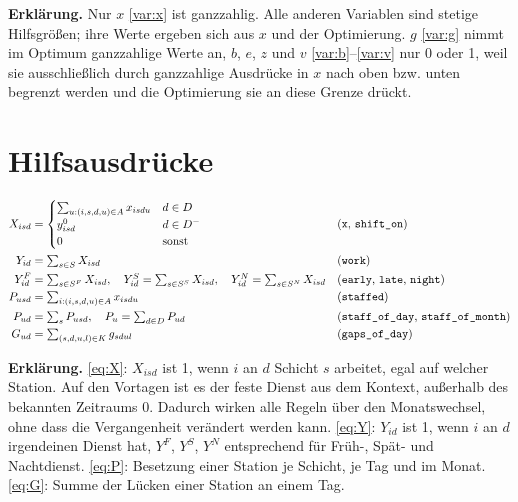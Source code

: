 \documentclass[11pt]{combiArticle}
\newcommand{\Dm}{D^{-}}
\newcommand{\code}[1]{\texttt{#1}}
\begin{document}
\textbf{Erklärung.}
Nur $x$ \eqref{var:x} ist ganzzahlig. Alle anderen Variablen sind stetige Hilfsgrößen; ihre Werte ergeben
sich aus $x$ und der Optimierung. $g$ \eqref{var:g} nimmt im Optimum ganzzahlige Werte an, $b$, $e$, $z$
und $v$ \eqref{var:b}--\eqref{var:v} nur 0 oder 1, weil sie ausschließlich durch ganzzahlige Ausdrücke in $x$
nach oben bzw. unten begrenzt werden und die Optimierung sie an diese Grenze drückt.

\section{Hilfsausdrücke}

\begin{align}
  X_{isd} &= \begin{cases}
      \sum_{u : (i,s,d,u) \in A} x_{isdu} & d \in D\\
      y^{0}_{isd} & d \in \Dm\\
      0 & \text{sonst}
    \end{cases} && \text{(\code{x}, \code{shift\_on})} \label{eq:X}\\
  Y_{id} &= \textstyle\sum_{s \in S} X_{isd} && \text{(\code{work})} \label{eq:Y}\\
  Y^{F}_{id} &= \textstyle\sum_{s \in S^{F}} X_{isd},\quad
  Y^{S}_{id} = \sum_{s \in S^{S}} X_{isd},\quad
  Y^{N}_{id} = \sum_{s \in S^{N}} X_{isd} && \text{(\code{early}, \code{late}, \code{night})} \notag\\
  P_{usd} &= \textstyle\sum_{i : (i,s,d,u) \in A} x_{isdu} && \text{(\code{staffed})} \label{eq:P}\\
  P_{ud} &= \textstyle\sum_{s} P_{usd},\quad
  P_{u} = \sum_{d \in D} P_{ud} && \text{(\code{staff\_of\_day}, \code{staff\_of\_month})} \notag\\
  G_{ud} &= \textstyle\sum_{(s,d,u,l) \in K} g_{sdul} && \text{(\code{gaps\_of\_day})} \label{eq:G}
\end{align}

\textbf{Erklärung.}
\eqref{eq:X}: $X_{isd}$ ist 1, wenn $i$ an $d$ Schicht $s$ arbeitet, egal auf welcher Station. Auf den
Vortagen ist es der feste Dienst aus dem Kontext, außerhalb des bekannten Zeitraums 0. Dadurch wirken alle
Regeln über den Monatswechsel, ohne dass die Vergangenheit verändert werden kann.
\eqref{eq:Y}: $Y_{id}$ ist 1, wenn $i$ an $d$ irgendeinen Dienst hat, $Y^{F}$, $Y^{S}$, $Y^{N}$ entsprechend
für Früh-, Spät- und Nachtdienst.
\eqref{eq:P}: Besetzung einer Station je Schicht, je Tag und im Monat.
\eqref{eq:G}: Summe der Lücken einer Station an einem Tag.
\end{document}
